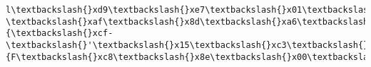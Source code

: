 \documentclass[11pt]{article}
\begin{document}
\begin{Verbatim}[commandchars=\\\{\}]
l\textbackslash{}xd9\textbackslash{}xe7\textbackslash{}x01\textbackslash{}xe0(\textbackslash{}x974J\textbackslash{}x04r\textbackslash{}xe1\textbackslash{}xef\_\textbackslash{}x1f\textbackslash{}x17\textbackslash{}xd7\textbackslash{}xaf\textbackslash{}x0fOY\textbackslash{}xe3!\textbackslash{}x11(\textbackslash{}x99\textbackslash{}xb9\textbackslash{}x85Y\textbackslash{}x08u\textbackslash{}x1d\textbackslash{}x12\textbackslash{}xe0\textbackslash{}x8bP\textbackslash{}\textbackslash{}\textbackslash{}xb8;C\textbackslash{}xca\textbackslash{}xb9\textbackslash{}xdb\textbackslash{}x17\textbackslash{}x83\textbackslash{}xfb,\%y\textbackslash{}x96\textasciitilde{}\textbackslash{}xb8\textbackslash{}xfd>j<\textbackslash{}xba\textbackslash{}nB\textbackslash{}xb3\textbackslash{}xd7Z\textbackslash{}xa3\textbackslash{}x1d\textbackslash{}x93\textbackslash{}xe6\textbackslash{}x80\textbackslash{}xeb\textbackslash{}x83\textbackslash{}xf2\_q\textbackslash{}x95\textbackslash{}xa6\textbackslash{}xc2\textbackslash{}x9a\textbackslash{}x1a\textbackslash{}x17m\textbackslash{}xc7K\textbackslash{}xb4\textbackslash{}x8a\textbackslash{}xb1v\textbackslash{}x83c]\textbackslash{}xd7\textbackslash{}x01\textbackslash{}x00@\textbackslash{}xdb\textbackslash{}xb6b\textbackslash{}x01*\textbackslash{}xa7h\textbackslash{}x94,@\textbackslash{}x17\textbackslash{}x11h\textbackslash{}x1e?\textbackslash{}xaf\textbackslash{}x8d\textbackslash{}xa6\textbackslash{}xef\textbackslash{}xcdn\textbackslash{}x1ft\textbackslash{}xfc\textbackslash{}xfc\textbackslash{}xf2\textbackslash{}x96\textbackslash{}xbcg\textbackslash{}x1cz\textbackslash{}x881\textbackslash{}xfe<\textbackslash{}x07\textbackslash{}xec\textbackslash{}xa1\textbackslash{}x14\textbackslash{}xfd\textbackslash{}xe32\textbackslash{}xc7x\textbackslash{}x1cz\textbackslash{}x1c\textbackslash{}x87\textbackslash{}x9euo\textbackslash{}x88\textbackslash{}xa1r\textbackslash{}xa1\%\textbackslash{}x9a\textbackslash{}xcbJB7\textbackslash{}xbb\textbackslash{}xbd\textbackslash{}x89E\textbackslash{}x80\{\textbackslash{}xcf-\textbackslash{}'\textbackslash{}x15\textbackslash{}xc3\textbackslash{}xb07R\textbackslash{}xc6:\textbackslash{}x92\textbackslash{}xf0\textbackslash{}xae\textbackslash{}x05T\textbackslash{}x0b\textbackslash{}xbc\#2\textbackslash{}xb1\textbackslash{}\textbackslash{}P\textbackslash{}x0b\textbackslash{}xbd\textbackslash{}xa0\textbackslash{}n\textbackslash{}xfaT\textbackslash{}x0b\textbackslash{}xff32\textbackslash{}xabOB\textbackslash{}xb3\textbackslash{}x00\textbackslash{}xd3\textbackslash{}xfc/\textbackslash{}xc3U\textbackslash{}t\textbackslash{}xf8\textbackslash{}x06s\textbackslash{}xcb\textbackslash{}xd5E\{F\textbackslash{}xc8\textbackslash{}x8e\textbackslash{}x00\textbackslash{}x00\textbackslash{}x00\textbackslash{}x00IEND\textbackslash{}xaeB`\textbackslash{}x82',

\end{Verbatim}
\end{document}
